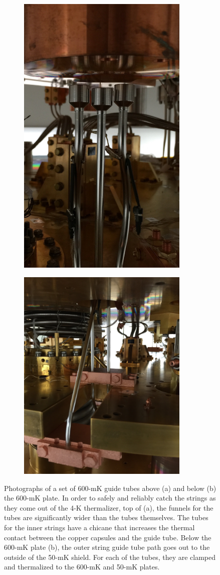 \begin{figure}[htbp]
\centering
\begin{subfigure}[t]{0.37\textwidth}
\centering
\includegraphics[width=0.9\textwidth, height= 3 in, keepaspectratio]{Figures/600mKguidetube_cropped.jpg}
\caption{}
\label{fig:600mk_guide_tubes_top}
\end{subfigure}
\qquad
\begin{subfigure}[t]{0.5\textwidth}
\centering
\includegraphics[width=0.9\textwidth, height = 3 in, keepaspectratio]{Figures/600mKguidetube_below_cropped.jpg}
\caption{}
\label{fig:600mk_guide_tubes_bottom}
\end{subfigure}
\caption[Photographs of a set of 600-mK guide tubes above (a) and below (b) the 600-mK plate.]
{Photographs of a set of 600-mK guide tubes above (a) and below (b) the 600-mK plate.
In order to safely and reliably catch the strings as they come out of the 4-K thermalizer, top of (a), the funnels for the tubes are significantly wider than the tubes themselves.
The tubes for the inner strings have a chicane that increases the thermal contact between the copper capsules and the guide tube.
Below the 600-mK plate (b), the outer string guide tube path goes out to the outside of the 50-mK shield.
For each of the tubes, they are clamped and thermalized to the 600-mK and 50-mK plates.}
\label{fig:600mK_guide_tubes}
\end{figure}

